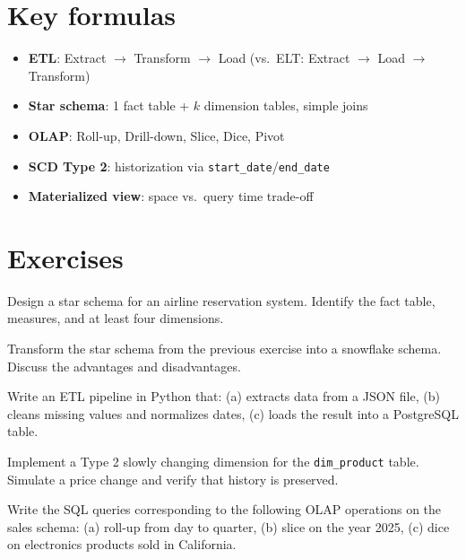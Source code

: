 \section{Key formulas}

\begin{keyformulas}
\begin{itemize}
  \item \textbf{ETL}: Extract $\to$ Transform $\to$ Load (vs.\ ELT: Extract $\to$ Load $\to$ Transform)
  \item \textbf{Star schema}: 1 fact table + $k$ dimension tables, simple joins
  \item \textbf{OLAP}: Roll-up, Drill-down, Slice, Dice, Pivot
  \item \textbf{SCD Type 2}: historization via \texttt{start\_date}/\texttt{end\_date}
  \item \textbf{Materialized view}: space vs.\ query time trade-off
\end{itemize}
\end{keyformulas}

\section{Exercises}

\begin{exercise}
Design a star schema for an airline reservation system. Identify the fact
table, measures, and at least four dimensions.
\end{exercise}

\begin{exercise}
Transform the star schema from the previous exercise into a snowflake
schema. Discuss the advantages and disadvantages.
\end{exercise}

\begin{exercise}
Write an ETL pipeline in Python that: (a) extracts data from a JSON file,
(b) cleans missing values and normalizes dates, (c) loads the result into
a PostgreSQL table.
\end{exercise}

\begin{exercise}
Implement a Type 2 slowly changing dimension for the \texttt{dim\_product}
table. Simulate a price change and verify that history is preserved.
\end{exercise}

\begin{exercise}
Write the SQL queries corresponding to the following OLAP operations on the
sales schema: (a) roll-up from day to quarter, (b) slice on the year 2025,
(c) dice on electronics products sold in California.
\end{exercise}
